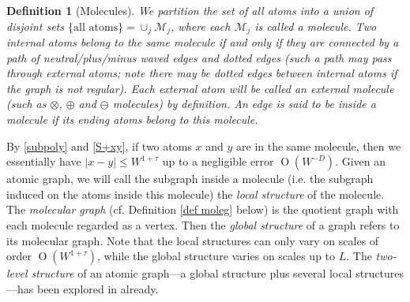 \documentclass{article}
\newcommand{\1}{\mathds{1}}
\numberwithin{equation}{section}
\renewcommand{\cal}{\mathcal}
\renewcommand{\leq}{\leqslant}
\renewcommand{\le}{\leq}
\DeclareMathOperator{\OO}{O}
\theoremstyle{plain} %
\newtheorem{definition}[theorem]{Definition}
\theoremstyle{remark}
\newtheorem{remark}[theorem]{Remark}
\newcommand{\cor}{\color{red}}
\newcommand{\hty}[1]{{\cor (ht: #1) }}
\begin{document}


\begin{definition}[Molecules]\label{def_poly}
	We partition the set of all atoms into a union of disjoint sets $\{\text{all atoms}\}=\cup_j \cal M_j$, where each $\cal M_j$ is called a molecule. Two internal atoms belong to the same molecule if and only if they are connected by a path of neutral/plus/minus {waved edges} and {dotted edges} (such a path may pass through external atoms; note there may be dotted edges between internal atoms if the graph is not regular).
	Each external atom will be called an external molecule (such as $\otimes$, $\oplus$ and $\ominus$ molecules) by definition.  An edge is said to be inside a molecule if its ending atoms belong to this molecule.
\end{definition}
By \eqref{subpoly} and \eqref{S+xy}, if two atoms $x$ and $y$ are in the same molecule, then we essentially have $|x-y|\le W^{1+\tau}$ up to a negligible error $\OO(W^{-D})$. %
Given an atomic graph, we will call the subgraph inside a molecule (i.e. the subgraph induced on the atoms inside this molecule) the  {\it local structure} of the molecule. The \emph{molecular graph} (cf. Definition \ref{def moleg} below) is the quotient graph with each molecule regarded as a vertex. Then the {\it global structure} of a graph refers to its molecular graph.
Note that the local structures can only vary on scales of order $\OO (W^{1+\tau})$, while the global structure varies on scales up to  $L$. The \emph{two-level structure} of an atomic graph---a global structure plus several local structures---has been explored in \cite{PartIII} already. 
\end{document}

